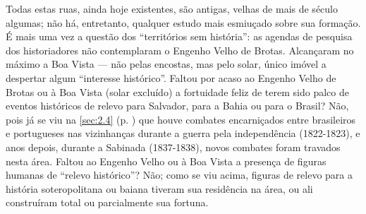 Todas estas ruas, ainda hoje existentes, são antigas, velhas de mais de século algumas; não há, entretanto, qualquer estudo mais esmiuçado sobre sua formação. É mais uma vez a questão dos ``territórios sem história'': as agendas de pesquisa dos historiadores não contemplaram o Engenho Velho de Brotas. Alcançaram no máximo a Boa Vista --- não pelas encostas, mas pelo solar, único imóvel a despertar algum ``interesse histórico''. Faltou por acaso ao Engenho Velho de Brotas ou à Boa Vista (solar excluído) a fortuidade feliz de terem sido palco de eventos históricos de relevo para Salvador, para a Bahia ou para o Brasil? Não, pois já se viu na \autoref{sec:2.4} (p. \pageref{sec:2.4}) que houve combates encarniçados entre brasileiros e portugueses nas vizinhanças durante a guerra pela independência (1822-1823), e anos depois, durante a Sabinada (1837-1838), novos combates foram travados nesta área. Faltou ao Engenho Velho ou à Boa Vista a presença de figuras humanas de ``relevo histórico''? Não; como se viu acima, figuras de relevo para a história soteropolitana ou baiana tiveram sua residência na área, ou ali construíram total ou parcialmente sua fortuna.

